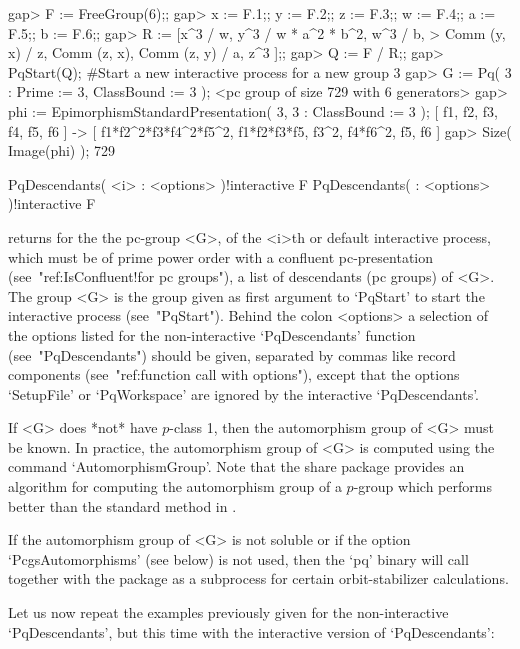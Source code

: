 \beginexample
gap> F := FreeGroup(6);;
gap> x := F.1;; y := F.2;; z := F.3;; w := F.4;; a := F.5;; b := F.6;;
gap> R := [x^3 / w, y^3 / w * a^2 * b^2, w^3 / b,
>          Comm (y, x) / z, Comm (z, x), Comm (z, y) / a, z^3 ];;
gap> Q := F / R;;
gap> PqStart(Q); #Start a new interactive process for a new group       
3
gap> G := Pq( 3 : Prime := 3, ClassBound := 3 );
<pc group of size 729 with 6 generators>
gap> phi := EpimorphismStandardPresentation( 3, 3 : ClassBound := 3 );
[ f1, f2, f3, f4, f5, f6 ] -> [ f1*f2^2*f3*f4^2*f5^2, f1*f2*f3*f5, f3^2, 
  f4*f6^2, f5, f6 ]
gap> Size( Image(phi) );
729
\endexample

\>PqDescendants( <i> : <options> )!{interactive} F
\>PqDescendants( : <options> )!{interactive} F

returns for the the pc-group <G>, of the  <i>th  or  default  interactive
{\ANUPQ} process, which must be of prime power  order  with  a  confluent
pc-presentation  (see~"ref:IsConfluent!for  pc  groups"),   a   list   of
descendants (pc groups) of <G>. The group <G> is the group given as first
argument  to  `PqStart'  to  start  the  interactive   {\ANUPQ}   process
(see~"PqStart"). Behind the colon <options> a selection  of  the  options
listed    for    the     non-interactive     `PqDescendants'     function
(see~"PqDescendants") should be given, separated by  commas  like  record
components  (see~"ref:function  call  with  options"),  except  that  the
options `SetupFile' or  `PqWorkspace'  are  ignored  by  the  interactive
`PqDescendants'.

If <G> does *not* have $p$-class 1, then the automorphism  group  of  <G>
must be known. In practice, the automorphism group  of  <G>  is  computed
using the {\GAP} command `AutomorphismGroup'. Note that the {\GAP}  share
package {\AutPGrp} provides an algorithm for computing  the  automorphism
group of a $p$-group which performs better than the  standard  method  in
{\GAP}.

If the automorphism group  of  <G>  is  not  soluble  or  if  the  option
`PcgsAutomorphisms' (see below) is not used, then the  `pq'  binary  will
call {\GAP} together with the {\AutPGrp}  package  as  a  subprocess  for
certain orbit-stabilizer calculations.

Let us now repeat the examples previously given for  the  non-interactive
`PqDescendants',  but  this  time  with  the   interactive   version   of
`PqDescendants':

